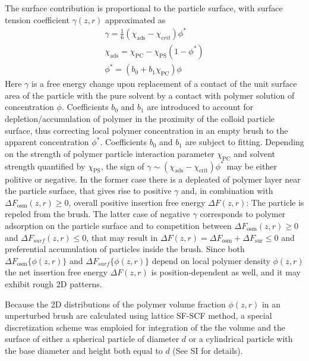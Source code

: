 \documentclass[12pt, a4paper]{article}
\begin{document}
The surface contribution is proportional to the particle surface, with surface tension coefficient $\gamma (z,r)$ approximated as
\begin{eqnarray}
    \gamma = \frac{1}{6}(\chi_{\textrm{ads}} - \chi_{crit})\phi^{\ast}
    \\
    \chi_{\textrm{ads}} = \chi_{\textrm{PC}} - \chi_{\textrm{PS}}(1-\phi^{\ast})
    \\
    \phi^{\ast}= (b_{0} + b_{1}\chi_{\textrm{PC}})\phi
\end{eqnarray}
Here $\gamma$ is a free energy change upon replacement of a contact of the unit surface area of the particle with the pure solvent by a contact with polymer solution of concentration $\phi$.
Coefficients $b_0$ and $b_1$ are introduced to account for  depletion/accumulation of polymer in the proximity of the colloid particle surface, thus correcting local polymer concentration in an empty brush 
to the apparent concentration $\phi^{\ast}$. Coefficients $b_0$ and $b_1$ are subject to fitting.
Depending on the strength of polymer particle interaction parameter $\chi_{\textrm{PC}}$ and solvent strength quantified by  $\chi_{\textrm{PS}}$, the sign of $\gamma \sim (\chi_{\textrm{ads}} - \chi_{\textrm{crit}})\phi^{\ast}$ may be either politive or negative.
In the former case there is a depleated of polymer layer near the particle surface, that gives rise to positive $\gamma$ and, in combination with $\Delta F_{\textrm{osm}}(z,r)\geq 0$, overall positive insertion free energy $\Delta F(z,r)$: 
The particle is repeled from the brush. The latter case of negative $\gamma$ corresponds to polymer adsorption on the particle surface and to competition between $\Delta F_{\textrm{osm}}(z,r)\geq 0$ and $\Delta F_{surf}(z,r)\leq 0$, 
that may result in $\Delta F(z,r) = \Delta F_{\textrm{osm}} + \Delta F_{\textrm{sur}}\leq 0$ and preferential accumulation of particles inside the brush. Since both $\Delta F_{\textrm{osm}}\{\phi(z,r)\}$ and $\Delta F_{surf}\{\phi(z,r)\}$ depend
on local polymer density $\phi(z,r)$ the net insertion free energy $\Delta F(z,r)$ is position-dependent as well, and it may exhibit rough 2D patterns.

Because the 2D distributions of the polymer volume fraction $\phi(z,r)$ in an unperturbed brush are calculated using lattice SF-SCF method, a special discretization scheme was emploied for integration 
of the the volume and the surface of either a spherical particle of diameter $d$ or a cylindrical particle with the base diameter and height both equal to $d$ (See SI for details).
\end{document}

